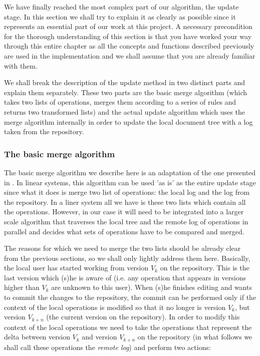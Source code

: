 We have finally reached the most complex part of our algorithm, the update stage. In this
section we shall try to explain it as clearly as possible since it represents an essential
part of our work at this project. A necessary precondition for the thorough understanding
of this section is that you have worked your way through this entire chapter as all the concepts
and functions described previously are used in the implementation and we shall assume that you
are already familiar with them.

We shall break the description of the update method in two distinct parts and explain them
separately. These two parts are the basic merge algorithm (which takes two lists of operations,
merges them according to a series of rules and returns two transformed lists) and the actual
update algorithm which uses the merge algorithm internally in order to update the local
document tree with a log taken from the repository.

\subsubsection{The basic merge algorithm}
\label{sec:merge}

The basic merge algorithm we describe here is an adaptation of the one presented in \cite{shen02}.
In linear systems, this algorithm can be used 'as is' as the entire update stage since what it does
is merge two list of operations: the local log and the log from the repository. In a liner system
all we have is these two lists which contain all the operations. However, in our case it will need
to be integrated into a larger scale algorithm that traverses the local tree and the remote log of
operations in parallel and decides what sets of operations have to be compared and merged.

The reasons for which we need to merge the two lists should be already clear from the previous
sections, so we shall only lightly address them here. Basically, the local user has started working
from version $V_{k}$ on the repository. This is the last version which (s)he is aware of (i.e.
any operation that appears in versions higher than $V_{k}$ are unknown to this user). When (s)he
finishes editing and wants to commit the changes to the repository, the commit can be performed only
if the context of the local operations is modified so that it no longer is version $V_{k}$, but version
$V_{k+n}$ (the current version on the repository). In order to modify this context of the local
operations we need to take the operations that represent the delta between version $V_{k}$ and
version $V_{k+n}$ on the repository (in what follows we shall call these operations the
\emph{remote log}) and perform two actions:

